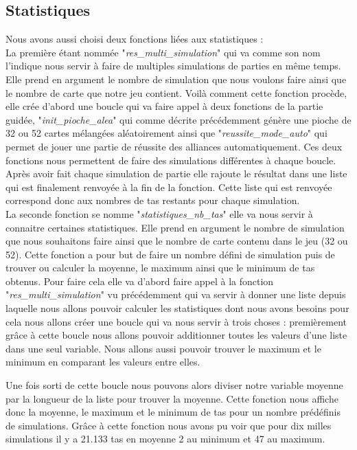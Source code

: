 \documentclass[10pt,a4paper,french,titlepage]{article}
\theoremstyle{definition}
\begin{document}
\subsection{Statistiques}
Nous avons aussi choisi deux fonctions liées aux statistiques : \\
La première étant nommée "\textit{res\_multi\_simulation}" qui va comme son nom l'indique nous servir à faire de multiples simulations de parties en même temps. Elle prend en argument le nombre de simulation que nous voulons faire ainsi que le nombre de carte que notre jeu contient. Voilà comment cette fonction procède, elle crée d'abord une boucle qui va faire appel à deux fonctions de la partie guidée, "\textit{init\_pioche\_alea}" qui comme décrite précédemment génère une pioche de 32 ou 52 cartes mélangées aléatoirement ainsi que "\textit{reussite\_mode\_auto}" qui permet de jouer une partie de réussite des alliances automatiquement. Ces deux fonctions nous permettent de faire des simulations différentes à chaque boucle. Après avoir fait chaque simulation de partie elle rajoute le résultat dans une liste qui est finalement renvoyée à la fin de la fonction. Cette liste qui est renvoyée correspond donc aux nombres de tas restants pour chaque simulation.\\

La seconde fonction se nomme "\textit{statistiques\_nb\_tas}" elle va nous servir à connaitre certaines statistiques. Elle prend en argument le nombre de simulation que nous souhaitons faire ainsi que le nombre de carte contenu dans le jeu (32 ou 52). Cette fonction a pour but de faire un nombre défini de simulation puis de trouver ou calculer la moyenne, le maximum ainsi que le minimum de tas obtenus. Pour faire cela elle va d'abord faire appel à la fonction "\textit{res\_multi\_simulation}" vu précédemment qui va servir à donner une liste depuis laquelle nous allons pouvoir calculer les statistiques dont nous avons besoins pour cela nous allons créer une boucle qui va nous servir à trois choses : premièrement grâce à cette boucle nous allons pouvoir additionner toutes les valeurs d'une liste dans une seul variable. Nous allons aussi pouvoir trouver le maximum et le minimum en comparant les valeurs entre elles.

Une fois sorti de cette boucle nous pouvons alors diviser notre variable moyenne par la longueur de la liste pour trouver la moyenne. Cette fonction nous affiche donc la moyenne, le maximum et le minimum de tas pour un nombre prédéfinis de simulations. Grâce à cette fonction nous avons pu voir que pour dix milles simulations il y a 21.133 tas en moyenne 2 au minimum et 47 au maximum.
\end{document}
